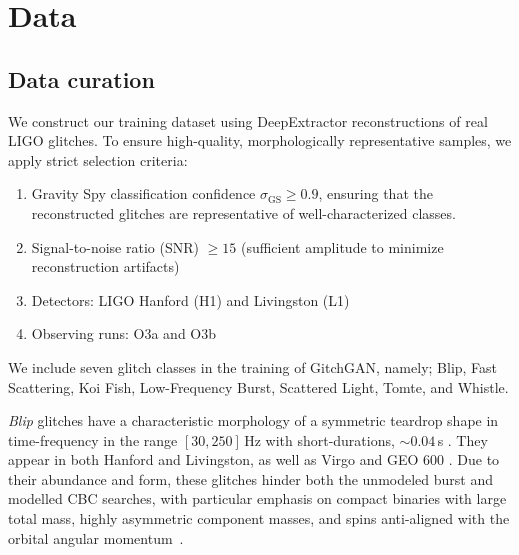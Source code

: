 \documentclass[reprint,nofootinbib,amsmath,amssymb,aps,floatfix]{revtex4-2}
\begin{document}

\vspace{-1mm}
\section{Data}
\label{sec:data}

\vspace{-1mm}

\subsection{Data curation}

We construct our training dataset using DeepExtractor reconstructions of real LIGO glitches.
To ensure high-quality, morphologically representative samples, we apply strict selection criteria:

\begin{enumerate}
\item
Gravity Spy classification confidence $\sigma_{\text{GS}} \geq 0.9$, ensuring that the reconstructed glitches are representative of well-characterized classes.

\item
Signal-to-noise ratio (SNR) $\geq 15$ (sufficient amplitude to minimize reconstruction artifacts)

\item
Detectors: LIGO Hanford (H1) and Livingston (L1)

\item
Observing runs: O3a and O3b


\end{enumerate}

We include seven glitch classes in the training of GitchGAN, namely; Blip, Fast Scattering, Koi Fish, Low-Frequency Burst, Scattered Light, Tomte, and Whistle.

\textit{Blip} glitches have a characteristic morphology of a symmetric teardrop shape in time-frequency in the range $[30, 250]\,$Hz with short-durations, $\sim 0.04\,$s \cite{abbott2016characterization}. 
They appear in both Hanford and Livingston, as well as Virgo and GEO $600$ \cite{Cabero:2019orq}. 
Due to their abundance and form, these glitches hinder both the unmodeled burst and modelled CBC searches, with particular emphasis on compact binaries with large total mass, highly asymmetric component masses, and spins anti-aligned with the orbital angular momentum~\cite{abbott2018effects}.
\end{document}
